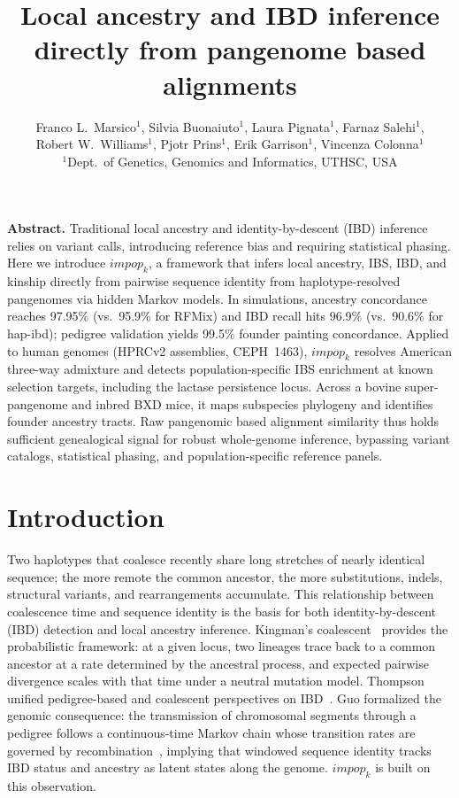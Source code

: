 \documentclass[10pt,twocolumn]{article}
\title{Local ancestry and IBD inference\\directly from pangenome based alignments}
\author{Franco L.\ Marsico$^1$, Silvia Buonaiuto$^1$, Laura Pignata$^1$, Farnaz Salehi$^1$,\\
Robert W.\ Williams$^1$, Pjotr Prins$^1$, Erik Garrison$^1$, Vincenza Colonna$^1$\\[0.5em]
{\normalsize $^1$Dept.\ of Genetics, Genomics and Informatics, UTHSC, USA}}
\date{}
\begin{document}
\maketitle

\textbf{Abstract.}
Traditional local ancestry and identity-by-descent (IBD) inference relies on variant
calls, introducing reference bias and requiring statistical phasing. Here we introduce
\texttt{$impop_k$}, a framework that infers local ancestry, IBS, IBD, and kinship
directly from pairwise sequence identity from haplotype-resolved pangenomes via hidden
Markov models. In simulations, ancestry concordance reaches 97.95\% (vs.\ 95.9\% for
RFMix) and IBD recall hits 96.9\% (vs.\ 90.6\% for hap-ibd); pedigree validation
yields 99.5\% founder painting concordance. Applied to human genomes (HPRCv2
assemblies, CEPH~1463), \texttt{$impop_k$} resolves American three-way admixture and
detects population-specific IBS enrichment at known selection targets, including the
lactase persistence locus. Across a bovine super-pangenome and inbred BXD mice, it
maps subspecies phylogeny and identifies founder ancestry tracts. Raw pangenomic based alignment similarity thus holds sufficient genealogical signal for robust whole-genome inference, bypassing variant catalogs, statistical phasing, and
population-specific reference panels.


\section{Introduction}

Two haplotypes that coalesce recently share long stretches of nearly identical sequence; the more remote the common ancestor, the more substitutions, indels, structural variants, and rearrangements accumulate. This relationship between coalescence time and sequence identity is the basis for both identity-by-descent (IBD) detection and local ancestry inference. Kingman's coalescent~\cite{kingman1982coalescent} provides the probabilistic framework: at a given locus, two lineages trace back to a common ancestor at a rate determined by the ancestral process, and expected pairwise divergence scales with that time under a neutral mutation model. Thompson unified pedigree-based and coalescent perspectives on IBD~\cite{thompson2013ibd}. Guo formalized the genomic consequence: the transmission of chromosomal segments through a pedigree follows a continuous-time Markov chain whose transition rates are governed by recombination~\cite{guo1994computation, guo1995proportion}, implying that windowed sequence identity tracks IBD status and ancestry as latent states along the genome. \texttt{$impop_k$} is built on this observation.
\end{document}
